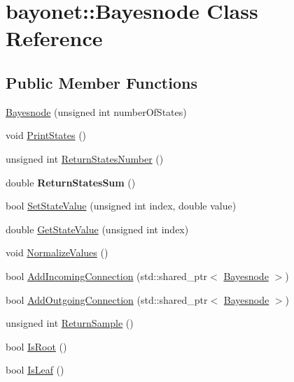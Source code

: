 \hypertarget{classbayonet_1_1_bayesnode}{\section{bayonet\-:\-:Bayesnode Class Reference}
\label{classbayonet_1_1_bayesnode}
}
\subsection*{Public Member Functions}
\begin{DoxyCompactItemize}
\item 
\hyperlink{classbayonet_1_1_bayesnode_a2b676188453fbbb4dc96be714ac931d3}{Bayesnode} (unsigned int number\-Of\-States)
\item 
void \hyperlink{classbayonet_1_1_bayesnode_abdbdfaca4d468449d0fd6217e27ec25d}{Print\-States} ()
\item 
unsigned int \hyperlink{classbayonet_1_1_bayesnode_a4237e16f1fa27d0b2db3ae1c9cd5f6e7}{Return\-States\-Number} ()
\item 
\hypertarget{classbayonet_1_1_bayesnode_a1c8d97fd7a7d6b848206ccca4dc17a96}{double {\bfseries Return\-States\-Sum} ()}\label{classbayonet_1_1_bayesnode_a1c8d97fd7a7d6b848206ccca4dc17a96}

\item 
bool \hyperlink{classbayonet_1_1_bayesnode_a9ccc692d3c2cb897b532a7308d58ab62}{Set\-State\-Value} (unsigned int index, double value)
\item 
double \hyperlink{classbayonet_1_1_bayesnode_aafca678755ca1d544d468cc9d825c4a1}{Get\-State\-Value} (unsigned int index)
\item 
void \hyperlink{classbayonet_1_1_bayesnode_af751c1310434e290a7866bc3de5bb466}{Normalize\-Values} ()
\item 
bool \hyperlink{classbayonet_1_1_bayesnode_ad8dbca37751fc6387a370daea4233aaf}{Add\-Incoming\-Connection} (std\-::shared\-\_\-ptr$<$ \hyperlink{classbayonet_1_1_bayesnode}{Bayesnode} $>$)
\item 
bool \hyperlink{classbayonet_1_1_bayesnode_ac43991461780ca9056b4977db4cbd603}{Add\-Outgoing\-Connection} (std\-::shared\-\_\-ptr$<$ \hyperlink{classbayonet_1_1_bayesnode}{Bayesnode} $>$)
\item 
unsigned int \hyperlink{classbayonet_1_1_bayesnode_a1849b4ba4dde1142f1228d6f4ac23fde}{Return\-Sample} ()
\item 
bool \hyperlink{classbayonet_1_1_bayesnode_a58a35d2f668568011181114550962981}{Is\-Root} ()
\item 
bool \hyperlink{classbayonet_1_1_bayesnode_ad1daa0c3ba4cb3704c0509df975d7206}{Is\-Leaf} ()
\end{DoxyCompactItemize}



